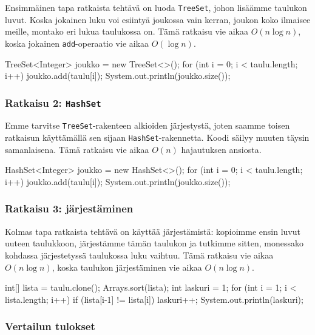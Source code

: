 Ensimmäinen tapa ratkaista tehtävä on luoda \texttt{TreeSet},
johon lisäämme taulukon luvut.
Koska jokainen luku voi esiintyä joukossa vain kerran,
joukon koko ilmaisee meille, montako eri lukua taulukossa on.
Tämä ratkaisu vie aikaa $O(n \log n)$, koska jokainen
\texttt{add}-operaatio vie aikaa $O(\log n)$.

\begin{code}
TreeSet<Integer> joukko = new TreeSet<>();
for (int i = 0; i < taulu.length; i++) {
    joukko.add(taulu[i]);
}
System.out.println(joukko.size());
\end{code}

\subsubsection{Ratkaisu 2: \texttt{HashSet}}

Emme tarvitse \texttt{TreeSet}-rakenteen
alkioiden järjestystä, joten saamme toisen ratkaisun
käyttämällä sen sijaan \texttt{HashSet}-rakennetta.
Koodi säilyy muuten täysin samanlaisena.
Tämä ratkaisu vie aikaa $O(n)$ hajautuksen ansiosta.

\begin{code}
HashSet<Integer> joukko = new HashSet<>();
for (int i = 0; i < taulu.length; i++) {
    joukko.add(taulu[i]);
}
System.out.println(joukko.size());
\end{code}

\subsubsection{Ratkaisu 3: järjestäminen}

Kolmas tapa ratkaista tehtävä on käyttää järjestämistä:
kopioimme ensin luvut uuteen taulukkoon, järjestämme tämän taulukon ja
tutkimme sitten, monessako kohdassa järjestetyssä taulukossa luku vaihtuu.
Tämä ratkaisu vie aikaa $O(n \log n)$, koska taulukon järjestäminen
vie aikaa $O(n \log n)$.

\begin{code}
int[] lista = taulu.clone();
Arrays.sort(lista);
int laskuri = 1;
for (int i = 1; i < lista.length; i++) {
    if (lista[i-1] != lista[i]) laskuri++;
}
System.out.println(laskuri);
\end{code}

\subsubsection{Vertailun tulokset}

